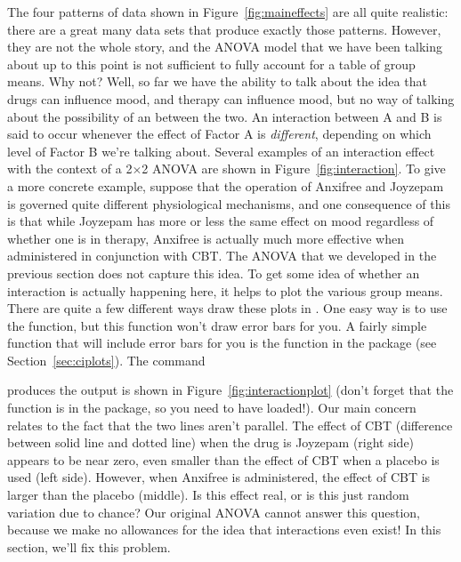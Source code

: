 The four patterns of data shown in Figure~\ref{fig:maineffects} are all quite realistic: there are a great many data sets that produce exactly those patterns. However, they are not the whole story, and the ANOVA model that we have been talking about up to this point is not sufficient to fully account for a table of group means. Why not? Well, so far we have the ability to talk about the idea that drugs can influence mood, and therapy can influence mood, but no way of talking about the possibility of an  between the two. An interaction between A and B is said to occur whenever the effect of Factor A is {\it different}, depending on which level of Factor B we're talking about. Several examples of an interaction effect with the context of a 2$\times$2 ANOVA are shown in Figure~\ref{fig:interaction}. To give a more concrete example, suppose that the operation of Anxifree and Joyzepam is governed quite different physiological mechanisms, and one consequence of this is that while Joyzepam has more or less the same effect on mood regardless of whether one is in therapy, Anxifree is actually much more effective when administered in conjunction with CBT. The ANOVA that we developed in the previous section does not capture this idea. To get some idea of whether an interaction is actually happening here, it helps to plot the various group means. There are quite a few different ways draw these plots in \R. One easy way is to use the  function, but this function won't draw error bars for you. A fairly simple function that will include error bars for you is the  function in the  package (see Section~\ref{sec:ciplots}). The command 
produces the output is shown in Figure~\ref{fig:interactionplot} (don't forget that the  function is in the  package, so you need to have  loaded!). Our main concern relates to the fact that the two lines aren't parallel. The effect of CBT (difference between solid line and dotted line) when the drug is Joyzepam (right side) appears to be near zero, even smaller than the effect of CBT when a placebo is used (left side). However, when Anxifree is administered, the effect of CBT is larger than the placebo (middle). Is this effect real, or is this just random variation due to chance? Our original ANOVA cannot answer this question, because we make no allowances for the idea that interactions even exist! In this section, we'll fix this problem.


